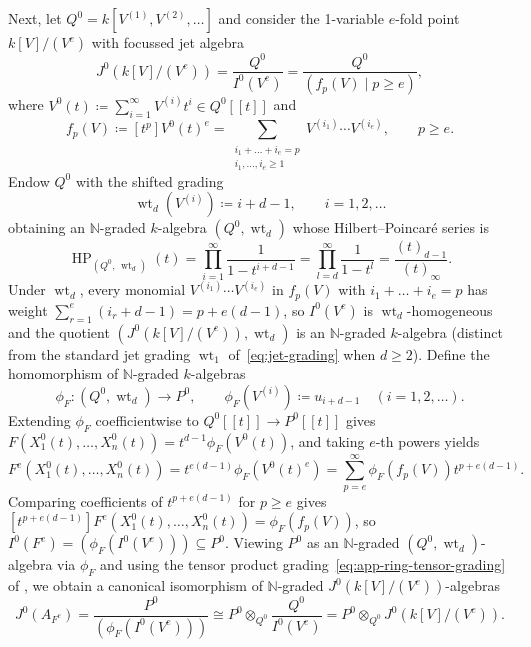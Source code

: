 \documentclass[a4paper, 12pt, reqno]{amsart}
\theoremstyle{remark}
\begin{document}
Next, let $Q^0 = k[V^{(1)}, V^{(2)}, \dots]$ and consider the 1-variable $e$-fold point $k[V]/(V^e)$ with focussed jet algebra
\begin{equation*}
  J^0(k[V]/(V^e)) = \frac{Q^0}{I^0(V^e)} = \frac{Q^0}{(f_p(V) \mid p \ge e)},
\end{equation*}
where $V^0(t) \coloneq \sum_{i = 1}^\infty V^{(i)} t^i \in Q^0[[t]]$ and
\begin{equation*}
  f_p(V) \coloneq [t^p]V^0(t)^e = \sum_{\substack{i_1 + \dots + i_e = p \\ i_1, \dots, i_e \ge 1}} V^{(i_1)} \cdots V^{(i_e)}, \qquad p \ge e.
\end{equation*}
Endow $Q^0$ with the shifted grading
\begin{equation*}
  \operatorname{wt}_d(V^{(i)}) \coloneq i + d - 1, \qquad i = 1, 2, \dots
\end{equation*}
obtaining an $\mathbb{N}$-graded $k$-algebra $(Q^0, \operatorname{wt}_d)$ whose Hilbert--Poincaré series is
\begin{equation*}
  \operatorname{HP}_{(Q^0, \, \operatorname{wt}_d)}(t) = \prod_{i = 1}^\infty \frac{1}{1 - t^{i + d - 1}} = \prod_{l = d}^\infty \frac{1}{1 - t^l} = \frac{(t)_{d - 1}}{(t)_\infty}.
\end{equation*}
Under $\operatorname{wt}_d$,
every monomial $V^{(i_1)} \cdots V^{(i_e)}$ in $f_p(V)$ with $i_1 + \dots + i_e = p$ has weight $\sum_{r = 1}^e (i_r + d - 1) = p + e(d - 1)$,
so $I^0(V^e)$ is $\operatorname{wt}_d$-homogeneous and the quotient $(J^0(k[V]/(V^e)), \operatorname{wt}_d)$ is an $\mathbb{N}$-graded $k$-algebra
(distinct from the standard jet grading $\operatorname{wt}_1$ of~\eqref{eq:jet-grading} when $d \ge 2$).
Define the homomorphism of $\mathbb{N}$-graded $k$-algebras
\begin{equation*}
  \phi_F \colon (Q^0, \operatorname{wt}_d) \to P^0, \qquad \phi_F(V^{(i)}) \coloneq u_{i + d - 1} \quad (i = 1, 2, \dots).
\end{equation*}
Extending $\phi_F$ coefficientwise to $Q^0[[t]] \to P^0[[t]]$ gives $F(X^0_1(t), \dots, X^0_n(t)) = t^{d - 1}\phi_F(V^0(t))$,
and taking $e$-th powers yields
\begin{equation*}
  F^e(X^0_1(t), \dots, X^0_n(t))
  = t^{e(d - 1)}\phi_F(V^0(t)^e)
  = \sum_{p = e}^\infty \phi_F(f_p(V)) t^{p + e(d - 1)}.
\end{equation*}
Comparing coefficients of $t^{p + e(d - 1)}$ for $p \ge e$ gives $[t^{p + e(d - 1)}]F^e(X^0_1(t), \dots, X^0_n(t)) = \phi_F(f_p(V))$,
so $I^0(F^e) = (\phi_F(I^0(V^e))) \subseteq P^0$.
Viewing $P^0$ as an $\mathbb{N}$-graded $(Q^0, \operatorname{wt}_d)$-algebra via $\phi_F$ and using the tensor product grading~\eqref{eq:app-ring-tensor-grading} of ,
we obtain a canonical isomorphism of $\mathbb{N}$-graded $J^0(k[V]/(V^e))$-algebras
\begin{equation}
  \label{eq:focussed-jet-base-change}
  J^0(A_{F^e}) = \frac{P^0}{(\phi_F(I^0(V^e)))} \cong P^0 \otimes_{Q^0} \frac{Q^0}{I^0(V^e)} = P^0 \otimes_{Q^0} J^0(k[V]/(V^e)).
\end{equation}
\end{document}
